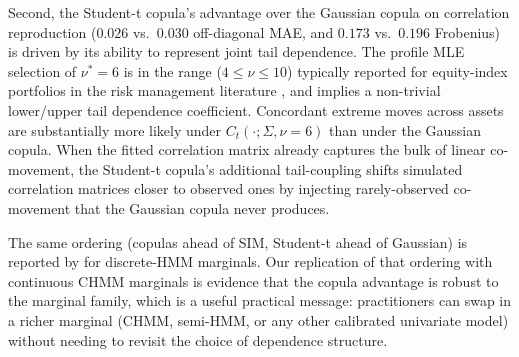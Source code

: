 Second, the Student-t copula's advantage over the Gaussian copula on correlation reproduction ($0.026$ vs.\ $0.030$ off-diagonal MAE, and $0.173$ vs.\ $0.196$ Frobenius) is driven by its ability to represent joint tail dependence.
The profile MLE selection of $\nu^* = 6$ is in the range ($4 \leq \nu \leq 10$) typically reported for equity-index portfolios in the risk management literature \cite{demarta2005tcopula, mcneil2015quantitative}, and implies a non-trivial lower/upper tail dependence coefficient.
Concordant extreme moves across assets are substantially more likely under $C_t(\cdot ; \Sigma, \nu = 6)$ than under the Gaussian copula.
When the fitted correlation matrix already captures the bulk of linear co-movement, the Student-t copula's additional tail-coupling shifts simulated correlation matrices closer to observed ones by injecting rarely-observed co-movement that the Gaussian copula never produces.

The same ordering (copulas ahead of SIM, Student-t ahead of Gaussian) is reported by \citet{alswaidan2026hybrid} for discrete-HMM marginals.
Our replication of that ordering with continuous CHMM marginals is evidence that the copula advantage is robust to the marginal family, which is a useful practical message: practitioners can swap in a richer marginal (CHMM, semi-HMM, or any other calibrated univariate model) without needing to revisit the choice of dependence structure.

